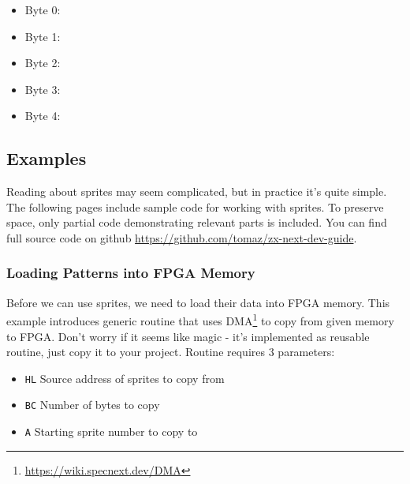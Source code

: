\begin{itemize}[topsep=1pt,itemsep=1pt]
    \item Byte 0: 
    \item Byte 1: 
    \item Byte 2: 
    \item Byte 3: 
    \item Byte 4: 
\end{itemize}


\subsection{Examples}

Reading about sprites may seem complicated, but in practice it's quite simple. The following pages include sample code for working with sprites. To preserve space, only partial code demonstrating relevant parts is included. You can find full source code on github \url{https://github.com/tomaz/zx-next-dev-guide}.


\pagebreak
\subsubsection{Loading Patterns into FPGA Memory}

Before we can use sprites, we need to load their data into FPGA memory. This example introduces generic routine that uses DMA\footnote{\url{https://wiki.specnext.dev/DMA}} to copy from given memory to FPGA. Don't worry if it seems like magic - it's implemented as reusable routine, just copy it to your project. Routine requires 3 parameters:

\begin{itemize}[topsep=1pt,itemsep=1pt]
    \item {\tt HL} Source address of sprites to copy from
    \item {\tt BC} Number of bytes to copy
    \item {\tt A} Starting sprite number to copy to
\end{itemize}

